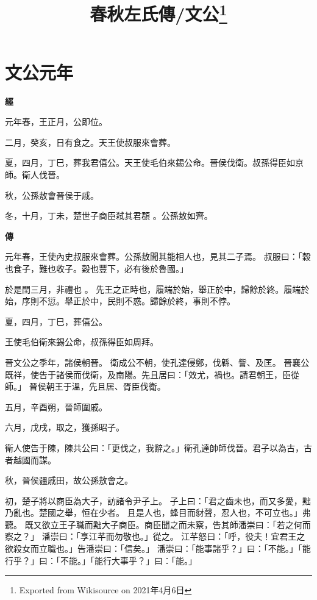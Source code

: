 \documentclass{ctexart}
\title{春秋左氏傳/文公\footnote{Exported from Wikisource on 2021年4月6日}}
\begin{document}
\maketitle









\section{文公元年}





\textbf{經}



元年春，王正月，公即位。

二月，癸亥，日有食之。天王使叔服來會葬。

夏，四月，丁巳，葬我君僖公。天王使毛伯來錫公命。晉侯伐衛。叔孫得臣如京師。衛人伐晉。

秋，公孫敖會晉侯于戚。

冬，十月，丁未，楚世子商臣弒其君頵 。公孫敖如齊。

\textbf{傳}



元年春，王使內史叔服來會葬。公孫敖聞其能相人也，見其二子焉。
叔服曰：「穀也食子，難也收子。穀也豐下，必有後於魯國。」

於是閏三月，非禮也 。
先王之正時也，履端於始，舉正於中，歸餘於終。履端於始，序則不愆。舉正於中，民則不惑。歸餘於終，事則不悖。

夏，四月，丁巳，葬僖公。

王使毛伯衛來錫公命，叔孫得臣如周拜。

晉文公之季年，諸侯朝晉。
衛成公不朝，使孔達侵鄭，伐緜、訾、及匡。
晉襄公既祥，使告于諸侯而伐衛，及南陽。先且居曰：「效尤，禍也。請君朝王，臣從師。」
晉侯朝王于溫，先且居、胥臣伐衛。

五月，辛酉朔，晉師圍戚。

六月，戊戌，取之，獲孫昭子。

衛人使告于陳，陳共公曰：「更伐之，我辭之。」衛孔達帥師伐晉。君子以為古，古者越國而謀。

秋，晉侯疆戚田，故公孫敖會之。

初，楚子將以商臣為大子，訪諸令尹子上。
子上曰：「君之齒未也，而又多愛，黜乃亂也。楚國之舉，恒在少者。
且是人也，蜂目而豺聲，忍人也，不可立也。」弗聽。
既又欲立王子職而黜大子商臣。商臣聞之而未察，告其師潘崇曰：「若之何而察之？」
潘崇曰：「享江芊而勿敬也。」從之。
江芊怒曰：「呼，役夫！宜君王之欲殺女而立職也。」告潘崇曰：「信矣。」
潘崇曰：「能事諸乎？」曰：「不能。」「能行乎？」曰：「不能。」「能行大事乎？」曰：「能。」
\end{document}
